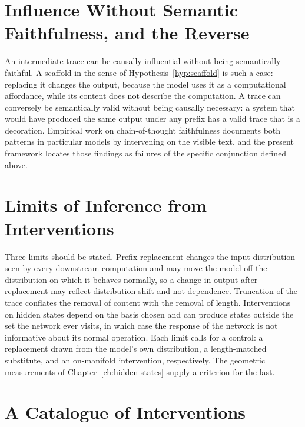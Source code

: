 \section{Influence Without Semantic Faithfulness, and the Reverse}

An intermediate trace can be causally influential without being semantically faithful. A scaffold in the sense of Hypothesis~\ref{hyp:scaffold} is such a case: replacing it changes the output, because the model uses it as a computational affordance, while its content does not describe the computation. A trace can conversely be semantically valid without being causally necessary: a system that would have produced the same output under any prefix has a valid trace that is a decoration. Empirical work on chain-of-thought faithfulness \cite{turpin2023,lanham2023} documents both patterns in particular models by intervening on the visible text, and the present framework locates those findings as failures of the specific conjunction defined above.

\section{Limits of Inference from Interventions}

Three limits should be stated. Prefix replacement changes the input distribution seen by every downstream computation and may move the model off the distribution on which it behaves normally, so a change in output after replacement may reflect distribution shift and not dependence. Truncation of the trace conflates the removal of content with the removal of length. Interventions on hidden states depend on the basis chosen and can produce states outside the set the network ever visits, in which case the response of the network is not informative about its normal operation. Each limit calls for a control: a replacement drawn from the model's own distribution, a length-matched substitute, and an on-manifold intervention, respectively. The geometric measurements of Chapter~\ref{ch:hidden-states} supply a criterion for the last.

\section{A Catalogue of Interventions}

